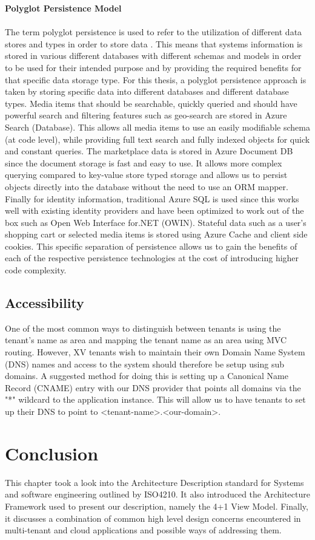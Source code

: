 \textbf{Polyglot Persistence Model}
\\
\\
The term polyglot persistence is used to refer to the utilization of different data stores and types in order to store data \cite{Sadalage2012-zw}. This means that systems information is stored in various different databases with different schemas and models in order to be used for their intended purpose and by providing the required benefits for that specific data storage type. For this thesis, a polyglot persistence approach is taken by storing specific data into different databases and different database types. Media items that should be searchable, quickly queried and should have powerful search and filtering features such as geo-search are stored in Azure Search  (Database). This allows all media items to use an easily modifiable schema (at code level), while providing full text search and fully indexed objects for quick and constant queries. The marketplace data is stored in Azure Document DB  since the document storage is fast and easy to use. It allows more complex querying compared to key-value store typed storage and allows us to persist objects directly into the database without the need to use an ORM mapper. Finally for identity information, traditional Azure SQL is used since this works well with existing identity providers and have been optimized to work out of the box such as Open Web Interface for.NET (OWIN). Stateful data such as a user's shopping cart or selected media items is stored using Azure Cache and client side cookies. This specific separation of persistence allows us to gain the benefits of each of the respective persistence technologies at the cost of introducing higher code complexity.


\subsection{Accessibility}

One of the most common ways to distinguish between tenants is using the tenant's name as area and mapping the tenant name as an area using MVC routing. However, XV tenants wish to maintain their own Domain Name System (DNS) names and access to the system should therefore be setup using sub domains. A suggested method for doing this is setting up a Canonical Name Record (CNAME) entry with our DNS provider that points all domains via the "*" wildcard to the application instance. This will allow us to have tenants to set up their DNS to point to <tenant-name>.<our-domain>.


\section{Conclusion}
This chapter took a look into the Architecture Description standard for Systems and software engineering outlined by ISO4210. It also introduced the Architecture Framework used to present our description, namely the 4+1 View Model. Finally, it discusses a combination of common high level design concerns encountered in multi-tenant and cloud applications and possible ways of addressing them. 